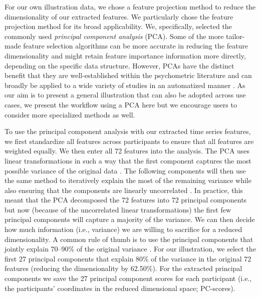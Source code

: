 For our own illustration data, we chose a feature projection method to
reduce the dimensionality of our extracted features. We particularly
chose the feature projection method for its broad applicability. We,
specifically, selected the commonly used
\textit{principal component analysis} (PCA). Some of the more
tailor-made feature selection algorithms can be more accurate in
reducing the feature dimensionality and might retain feature importance
information more directly, depending on the specific data structure.
However, PCAs have the distinct benefit that they are well-established
within the psychometric literature \citep{jolliffe2011} and can broadly
be applied to a wide variety of studies in an automatized manner
\citep{abdi2010}. As our aim is to present a general illustration that
can also be adopted across use cases, we present the workflow using a
PCA here but we encourage users to consider more specialized methods as
well.

To use the principal component analysis with our extracted time series
features, we first standardize all features across participants to
ensure that all features are weighted equally. We then enter all 72
features into the analysis. The PCA uses linear transformations in such
a way that the first component captures the most possible variance of
the original data
\citep[e.g., by finding a vector that maximizes the sum of squared distances][]{jolliffe2002, abdi2010}.
The following components will then use the same method to iteratively
explain the most of the remaining variance while also ensuring that the
components are linearly uncorrelated \citep{shlens2014}. In practice,
this meant that the PCA decomposed the 72 features into 72 principal
components but now (because of the uncorrelated linear transformations)
the first few principal components will capture a majority of the
variance. We can then decide how much information (i.e., variance) we
are willing to sacrifice for a reduced dimensionality. A common rule of
thumb is to use the principal components that jointly explain 70--90\%
of the original variance
\citep[i.e., cumulative percentage explained variance; e.g.,][]{jackson2003}.
For our illustration, we select the first 27 principal components that
explain 80\% of the variance in the original 72 features (reducing the
dimensionality by 62.50\%). For the extracted principal components we
save the 27 principal component scores for each participant (i.e., the
participants' coordinates in the reduced dimensional space; PC-scores).

